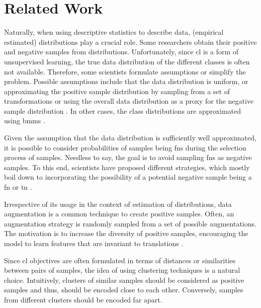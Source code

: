 \section{Related Work}\label{sec:related_work}

Naturally, when using descriptive statistics to describe data, (empirical estimated) distributions play a crucial role.
Some researchers obtain their positive and negative samples from distributions.
Unfortunately, since \ac{cl} is a form of unsupervised learning, 
the true data distribution of the different classes is often not available.
Therefore, some scientists formulate assumptions or simplify the problem.
Possible assumptions include that the data distribution is uniform,
or approximating the positive sample distribution by sampling from a set of transformations 
or using the overall data distribution as a proxy for the negative sample distribution \citet{chuang_debiased_2020,robinson_contrastive_2021}.
In other cases, the class distributions are approximated using \acp{bmm} \citet{progcl_2022}.

Given the assumption that the data distribution is sufficiently well approximated, 
it is possible to consider probabilities of samples being \acp{fn} during the selection process of samples.
Needless to say, the goal is to avoid sampling \acp{fn} as negative samples.
To this end, scientists have proposed different strategies, which mostly boil down to 
incorporating the possibility of a potential negative sample being a \ac{fn} or \ac{tn} 
\citet{chuang_debiased_2020,robinson_contrastive_2021,progcl_2022}.


Irrespective of its usage in the context of estimation of distributions, 
data augmentation is a common technique to create positive samples.
Often, an augmentation strategy is randomly sampled from a set of possible augmentations.
The motivation is to increase the diversity of positive samples, 
encouraging the model to learn features that are invariant to translations 
\citet{PIC_2020,swav_2020,local_aggr_2019,grape_2024,CL_temp_2021}.


Since \ac{cl} objectives are often formulated in terms of distances or similarities between pairs of samples, 
the idea of using clustering techniques is a natural choice.
Intuitively, clusters of similar samples should be considered as positive samples and thus,
should be encoded close to each other.
Conversely, samples from different clusters should be encoded far apart.

